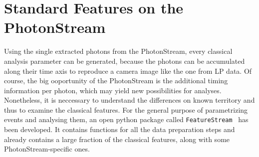 \section{Standard Features on the PhotonStream}
%
Using the single extracted photons from the PhotonStream, every classical
analysis parameter can be generated, because the photons can be accumulated
along their time axis to reproduce a camera image like the one from LP data. Of
course, the big ooportunity of the PhotonStream is the additional timing
information per photon, which may yield new possibilities for analyses.
Nonetheless, it is neccessary to understand the differences on known territory
and thus to examine the classical features. For the general purpose of
parametrizing events and analysing them, an open python package called
\texttt{FeatureStream}~\cite{FeatureStream} has been developed. It contains
functions for all the data preparation steps and already contains a large 
fraction of the classical features, along with some PhotonStream-specific ones.

